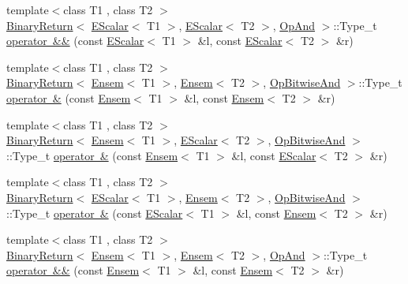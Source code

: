 \begin{DoxyCompactItemize}
\item 
{\footnotesize template$<$class T1 , class T2 $>$ }\\\mbox{\hyperlink{structENSEM_1_1BinaryReturn}{Binary\+Return}}$<$ \mbox{\hyperlink{classENSEM_1_1EScalar}{E\+Scalar}}$<$ T1 $>$, \mbox{\hyperlink{classENSEM_1_1EScalar}{E\+Scalar}}$<$ T2 $>$, \mbox{\hyperlink{structENSEM_1_1OpAnd}{Op\+And}} $>$\+::Type\+\_\+t \mbox{\hyperlink{namespaceENSEM_ga8ca8cd66f3b104a6439afa608f4a6e50}{operator \&\&}} (const \mbox{\hyperlink{classENSEM_1_1EScalar}{E\+Scalar}}$<$ T1 $>$ \&l, const \mbox{\hyperlink{classENSEM_1_1EScalar}{E\+Scalar}}$<$ T2 $>$ \&r)
\item 
{\footnotesize template$<$class T1 , class T2 $>$ }\\\mbox{\hyperlink{structENSEM_1_1BinaryReturn}{Binary\+Return}}$<$ \mbox{\hyperlink{classENSEM_1_1Ensem}{Ensem}}$<$ T1 $>$, \mbox{\hyperlink{classENSEM_1_1Ensem}{Ensem}}$<$ T2 $>$, \mbox{\hyperlink{structENSEM_1_1OpBitwiseAnd}{Op\+Bitwise\+And}} $>$\+::Type\+\_\+t \mbox{\hyperlink{namespaceENSEM_gaeb51787a8e99aa2d96b292b6b53160fb}{operator \&}} (const \mbox{\hyperlink{classENSEM_1_1Ensem}{Ensem}}$<$ T1 $>$ \&l, const \mbox{\hyperlink{classENSEM_1_1Ensem}{Ensem}}$<$ T2 $>$ \&r)
\item 
{\footnotesize template$<$class T1 , class T2 $>$ }\\\mbox{\hyperlink{structENSEM_1_1BinaryReturn}{Binary\+Return}}$<$ \mbox{\hyperlink{classENSEM_1_1Ensem}{Ensem}}$<$ T1 $>$, \mbox{\hyperlink{classENSEM_1_1EScalar}{E\+Scalar}}$<$ T2 $>$, \mbox{\hyperlink{structENSEM_1_1OpBitwiseAnd}{Op\+Bitwise\+And}} $>$\+::Type\+\_\+t \mbox{\hyperlink{namespaceENSEM_gadd38c6dbde8cad60658e2a3429480978}{operator \&}} (const \mbox{\hyperlink{classENSEM_1_1Ensem}{Ensem}}$<$ T1 $>$ \&l, const \mbox{\hyperlink{classENSEM_1_1EScalar}{E\+Scalar}}$<$ T2 $>$ \&r)
\item 
{\footnotesize template$<$class T1 , class T2 $>$ }\\\mbox{\hyperlink{structENSEM_1_1BinaryReturn}{Binary\+Return}}$<$ \mbox{\hyperlink{classENSEM_1_1EScalar}{E\+Scalar}}$<$ T1 $>$, \mbox{\hyperlink{classENSEM_1_1Ensem}{Ensem}}$<$ T2 $>$, \mbox{\hyperlink{structENSEM_1_1OpBitwiseAnd}{Op\+Bitwise\+And}} $>$\+::Type\+\_\+t \mbox{\hyperlink{namespaceENSEM_ga81252fa8c928f420f2676e632c49a421}{operator \&}} (const \mbox{\hyperlink{classENSEM_1_1EScalar}{E\+Scalar}}$<$ T1 $>$ \&l, const \mbox{\hyperlink{classENSEM_1_1Ensem}{Ensem}}$<$ T2 $>$ \&r)
\item 
{\footnotesize template$<$class T1 , class T2 $>$ }\\\mbox{\hyperlink{structENSEM_1_1BinaryReturn}{Binary\+Return}}$<$ \mbox{\hyperlink{classENSEM_1_1Ensem}{Ensem}}$<$ T1 $>$, \mbox{\hyperlink{classENSEM_1_1Ensem}{Ensem}}$<$ T2 $>$, \mbox{\hyperlink{structENSEM_1_1OpAnd}{Op\+And}} $>$\+::Type\+\_\+t \mbox{\hyperlink{namespaceENSEM_ga1a9761f53df3f59110335a2a8cf2d67c}{operator \&\&}} (const \mbox{\hyperlink{classENSEM_1_1Ensem}{Ensem}}$<$ T1 $>$ \&l, const \mbox{\hyperlink{classENSEM_1_1Ensem}{Ensem}}$<$ T2 $>$ \&r)

\end{DoxyCompactItemize}
